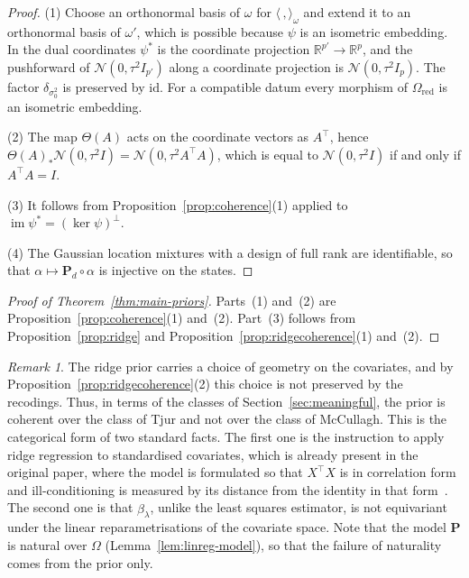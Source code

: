 \documentclass[11pt,a4paper]{article}
\theoremstyle{plain}
\theoremstyle{definition}
\theoremstyle{remark}
\newtheorem{remark}[theorem]{Remark}
\newcommand{\cat}[1]{\mathsf{#1}}
\newcommand{\catO}{\cat{\Omega}}
\newcommand{\id}{\mathrm{id}}
\newcommand{\R}{\mathbb{R}}
\newcommand{\Norm}{\mathcal{N}}
\begin{document}
\begin{proof}
(1) Choose an orthonormal basis of $\omega$ for
$\langle\,,\rangle_{\omega}$ and extend it to an orthonormal basis of
$\omega'$, which is possible because $\psi$ is an isometric embedding. In the
dual coordinates $\psi^{*}$ is the coordinate projection
$\R^{p'} \to \R^{p}$, and the pushforward of $\Norm(0,\tau^{2}I_{p'})$ along a
coordinate projection is $\Norm(0,\tau^{2}I_{p})$. The factor
$\delta_{\sigma_{0}^{2}}$ is preserved by $\id$. For a compatible datum every
morphism of $\catO_{\mathrm{red}}$ is an isometric embedding.

(2) The map $\Theta(A)$ acts on the coordinate vectors as $A^{\!\top}$, hence
$\Theta(A)_{*}\Norm(0,\tau^{2}I) = \Norm(0,\tau^{2}A^{\!\top}A)$, which is
equal to $\Norm(0,\tau^{2}I)$ if and only if $A^{\!\top}A = I$.

(3) It follows from Proposition~\ref{prop:coherence}(1) applied to
$\operatorname{im}\psi^{*} = (\ker\psi)^{\perp}$.

(4) The Gaussian location mixtures with a design of full rank are
identifiable, so that $\alpha \mapsto \mathbf{P}_{d}\circ\alpha$ is injective
on the states.
\end{proof}

\begin{proof}[Proof of Theorem~\ref{thm:main-priors}]
Parts~(1) and~(2) are Proposition~\ref{prop:coherence}(1) and~(2). Part~(3)
follows from Proposition~\ref{prop:ridge} and
Proposition~\ref{prop:ridgecoherence}(1) and~(2).
\end{proof}

\begin{remark}\label{rem:standardise}
The ridge prior carries a choice of geometry on the covariates, and by
Proposition~\ref{prop:ridgecoherence}(2) this choice is not preserved by the
recodings. Thus, in terms of the classes of Section~\ref{sec:meaningful}, the
prior is coherent over the class of Tjur and not over the class of McCullagh.
This is the categorical form of two standard facts. The first one is the
instruction to apply ridge regression to standardised covariates, which is
already present in the original paper, where the model is formulated so that
$X^{\!\top}X$ is in correlation form and ill-conditioning is measured by its
distance from the identity in that
form~\cite[pp.~55--56]{hoerl_ridge_1970}. The second one is that
$\widehat\beta_{\lambda}$, unlike the least squares estimator, is not
equivariant under the linear reparametrisations of the covariate space. Note
that the model $\mathbf{P}$ is natural over $\catO$
(Lemma~\ref{lem:linreg-model}), so that the failure of naturality comes from
the prior only.
\end{remark}
\end{document}
